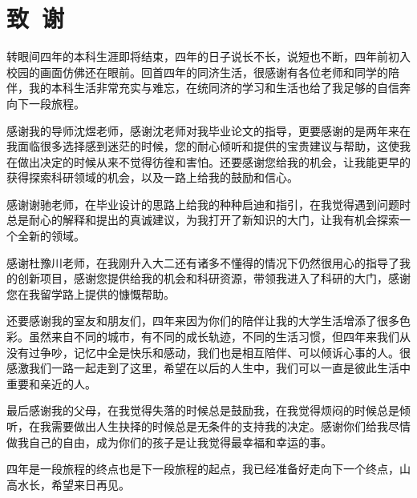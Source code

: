 \documentclass[]{tongjithesis}
\numberwithin{equation}{chapter}
\begin{document}
{
	\printbibliography[]
}
\clearpage
{}
\chapter*{致~谢}
转眼间四年的本科生涯即将结束，四年的日子说长不长，说短也不断，四年前初入校园的画面仿佛还在眼前。回首四年的同济生活，很感谢有各位老师和同学的陪伴，我的本科生活非常充实与难忘，在统同济的学习和生活也给了我足够的自信奔向下一段旅程。

感谢我的导师沈煜老师，感谢沈老师对我毕业论文的指导，更要感谢的是两年来在我面临很多选择感到迷茫的时候，您的耐心倾听和提供的宝贵建议与帮助，这使我在做出决定的时候从来不觉得彷徨和害怕。还要感谢您给我的机会，让我能更早的获得探索科研领域的机会，以及一路上给我的鼓励和信心。

感谢谢驰老师，在毕业设计的思路上给我的种种启迪和指引，在我觉得遇到问题时总是耐心的解释和提出的真诚建议，为我打开了新知识的大门，让我有机会探索一个全新的领域。

感谢杜豫川老师，在我刚升入大二还有诸多不懂得的情况下仍然很用心的指导了我的创新项目，感谢您提供给我的机会和科研资源，带领我进入了科研的大门，感谢您在我留学路上提供的慷慨帮助。

还要感谢我的室友和朋友们，四年来因为你们的陪伴让我的大学生活增添了很多色彩。虽然来自不同的城市，有不同的成长轨迹，不同的生活习惯，但四年来我们从没有过争吵，记忆中全是快乐和感动，我们也是相互陪伴、可以倾诉心事的人。很感激我们一路一起走到了这里，希望在以后的人生中，我们可以一直是彼此生活中重要和亲近的人。

最后感谢我的父母，在我觉得失落的时候总是鼓励我，在我觉得烦闷的时候总是倾听，在我需要做出人生抉择的时候总是无条件的支持我的决定。感谢你们给我尽情做我自己的自由，成为你们的孩子是让我觉得最幸福和幸运的事。

四年是一段旅程的终点也是下一段旅程的起点，我已经准备好走向下一个终点，山高水长，希望来日再见。
\end{document}
